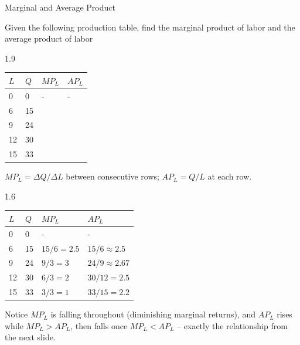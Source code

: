 \documentclass{beamer}
\begin{document}
\begin{frame}{Marginal and Average Product}
  
  \bigskip
  Given the following production table, find the marginal product of labor and the average product of labor
  \begin{center}
    \begin{spacing}{1.9}
      \begin{tabular}{ | l | l | l | l |}
        \hline
        $L$ & $Q$ & $MP_L$ & $AP_L$ \\ \hline
        0  & 0  & - & - \\ \hline
        6  & 15 &   &   \\ \hline
        9  & 24 &   &   \\ \hline
        12 & 30 &   &   \\ \hline
        15 & 33 &   &   \\
        \hline
      \end{tabular}
    \end{spacing}
  \end{center}
\end{frame}

\begin{frame}

  \bigskip
  $MP_L = \Delta Q / \Delta L$ between consecutive rows; $AP_L = Q/L$ at each row.

  \begin{center}
    \begin{spacing}{1.6}
      \begin{tabular}{ | l | l | l | l |}
        \hline
        $L$ & $Q$ & $MP_L$ & $AP_L$ \\ \hline
        0  & 0  & - & - \\ \hline
        6  & 15 & $15/6=2.5$ & $15/6\approx2.5$ \\ \hline
        9  & 24 & $9/3=3$ & $24/9\approx2.67$ \\ \hline
        12 & 30 & $6/3=2$ & $30/12=2.5$ \\ \hline
        15 & 33 & $3/3=1$ & $33/15=2.2$ \\
        \hline
      \end{tabular}
    \end{spacing}
  \end{center}

  \bigskip
  Notice $MP_L$ is falling throughout (diminishing marginal returns), and $AP_L$ rises while $MP_L>AP_L$, then falls once $MP_L<AP_L$ -- exactly the relationship from the next slide.
\end{frame}
\end{document}
